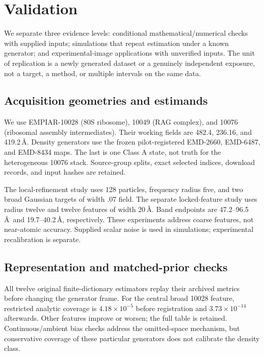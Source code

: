 \documentclass{article}
\begin{document}
\section{Validation}
We separate three evidence levels: conditional mathematical/numerical checks with supplied inputs; simulations that repeat estimation under a known generator; and experimental-image applications with unverified inputs. The unit of replication is a newly generated dataset or a genuinely independent exposure, not a target, a method, or multiple intervals on the same data.

\subsection{Acquisition geometries and estimands}
We use EMPIAR-10028 (80S ribosome), 10049 (RAG complex), and 10076 (ribosomal assembly intermediates). Their working fields are 482.4, 236.16, and 419.2\,\AA. Density generators use the frozen pilot-registered EMD-2660, EMD-6487, and EMD-8434 maps. The last is one Class A state, not truth for the heterogeneous 10076 stack. Source-group splits, exact selected indices, download records, and input hashes are retained.

The local-refinement study uses 128 particles, frequency radius five, and two broad Gaussian targets of width .07 field. The separate locked-feature study uses radius twelve and twelve features of width 20\,\AA. Band endpoints are 47.2--96.5\,\AA\ and 19.7--40.2\,\AA, respectively. These experiments address coarse features, not near-atomic accuracy. Supplied scalar noise is used in simulations; experimental recalibration is separate.

\subsection{Representation and matched-prior checks}
All twelve original finite-dictionary estimators replay their archived metrics before changing the generator frame. For the central broad 10028 feature, restricted analytic coverage is $4.18\times10^{-5}$ before registration and $3.73\times10^{-14}$ afterwards. Other features improve or worsen; the full table is retained. Continuous/ambient bias checks address the omitted-space mechanism, but conservative coverage of these particular generators does not calibrate the density class.
\end{document}
